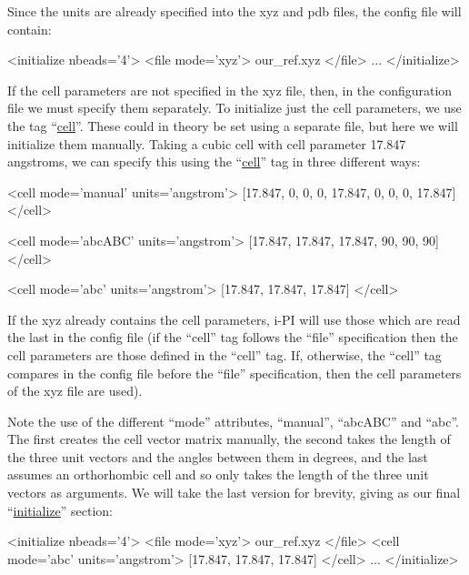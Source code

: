 \documentclass[11pt,english,fleqn]{report}
\newenvironment{code}{%
\footnotesize
\verbatim
}{
\endverbatim
\normalsize
}
\begin{document}
Since the units are already specified into the xyz and pdb files, the
config file will contain:

\begin{code}
<initialize nbeads='4'>
   <file mode='xyz'> our_ref.xyz </file>
   ...
</initialize>
\end{code}

If the cell parameters are not specified in the xyz file, then, in the
configuration file we must specify them separately.
To initialize just the cell parameters,
we use the tag {}``\hyperref[INITCELL]{cell}''.
These could in theory be set using a separate
file, but here we will initialize them manually. Taking a cubic cell
with cell parameter 17.847 angstroms, we can specify this using
the {}``\hyperref[INITCELL]{cell}'' tag in three different ways:

\begin{code}
<cell mode='manual' units='angstrom'>
   [17.847, 0, 0, 0, 17.847, 0, 0, 0, 17.847]
</cell>
\end{code}

\begin{code}
<cell mode='abcABC' units='angstrom'>
   [17.847, 17.847, 17.847, 90, 90, 90]
</cell>
\end{code}

\begin{code}
<cell mode='abc' units='angstrom'>
   [17.847, 17.847, 17.847]
</cell>
\end{code}

If the xyz already contains the cell parameters, i-PI will use those
which are read the last in the config file (if the {}``cell'' tag
follows the {}``file'' specification then the cell parameters are those
defined in the {}``cell'' tag. If, otherwise, the {}``cell'' tag
compares in the config file before the {}``file'' specification, then
the cell parameters of the xyz file are used).

Note the use of the different {}``mode'' attributes, {}``manual'',
{}``abcABC'' and {}``abc''. The first creates the cell vector
matrix manually, the second takes the length of the three unit vectors
and the angles between them in degrees, and the last assumes an orthorhombic
cell and so only takes the length of the three unit vectors as arguments.
We will take the last version for brevity, giving as our final
{}``\hyperref[INITIALIZER]{initialize}'' section:

\begin{code}
<initialize nbeads='4'>
   <file mode='xyz'> our_ref.xyz </file>
   <cell mode='abc' units='angstrom'>
      [17.847, 17.847, 17.847]
   </cell>
   ...
</initialize>
\end{code}
\end{document}
